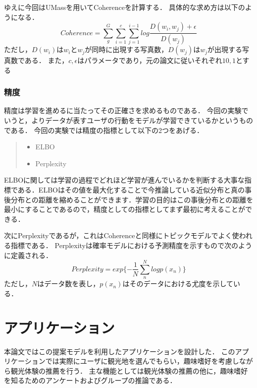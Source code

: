 \documentclass[a4j,10pt, twocolumn]{jarticle}
\begin{document}
ゆえに今回はUMassを用いてCoherenceを計算する．
具体的な求め方は以下のようになる．
\begin{equation*}
  Coherence = \sum_g^G \sum_{i=1}^c \sum_{j=1}^{i-1} log \frac{D(w_i, w_j) + \epsilon}{D(w_j)}
\end{equation*}
ただし，$D(w_i)$は$w_i$と$w_j$が同時に出現する写真数，$D(w_j)$は$w_j$が出現する写真数である．
また，$c, \epsilon$はパラメータであり，元の論文\cite{mimno2011optimizing}に従いそれぞれ$10, 1$とする

\subsubsection{精度} \label{precision}
精度は学習を進めるに当たってその正確さを求めるものである．
今回の実験でいうと，よりデータが表すユーザの行動をモデルが学習できているかというものである．
今回の実験では精度の指標として以下の2つをあげる．

\begin{quote}
  \begin{itemize}
      \item ELBO
      \item Perplexity
  \end{itemize}
\end{quote}

ELBOに関しては学習の過程でどれほど学習が進んでいるかを判断する大事な指標である．ELBOはその値を最大化することで今推論している近似分布と真の事後分布との距離を縮めることができます．学習の目的はこの事後分布との距離を最小にすることであるので，精度としての指標としてまず最初に考えることができる．

次にPerplexityであるが，これはCoherenceと同様にトピックモデルでよく使われる指標である．
Perplexityは確率モデルにおける予測精度を示すもので次のように定義される．
\begin{equation*}
  Perplexity = exp \{ - \frac{1}{N} \sum_n^N log p(x_n) \}
\end{equation*}
ただし，$N$はデータ数を表し，$p(x_n)$はそのデータにおける尤度を示している．


\section{アプリケーション} \label{application}
本論文ではこの提案モデルを利用したアプリケーションを設計した．
このアプリケーションでは実際にユーザに観光地を選んでもらい，趣味嗜好を考慮しながら観光体験の推薦を行う．
主な機能としては観光体験の推薦の他に，趣味嗜好を知るためのアンケートおよびグループの推論である．
\end{document}
